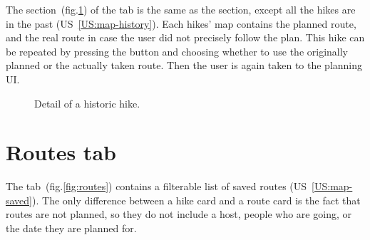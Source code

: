 The  section~(fig.\ref{fig:plan-history}) of the  tab is the same as the  section, except all the hikes are in the past (US~\ref{US:map-history}).
Each hikes' map contains the planned route, and the real route in case the user did not precisely follow the plan.
This hike can be repeated by pressing the  button and choosing whether to use the originally planned or the actually taken route.
Then the user is again taken to the planning UI.

\begin{figure}[h!]
    \centering
    \hfill
    \caption{Detail of a historic hike.}
    \label{fig:plan-history}
\end{figure}

\section{Routes tab}
The  tab~(fig.\ref{fig:routes}) contains a filterable list of saved routes (US~\ref{US:map-saved}).
The only difference between a hike card and a route card is the fact that routes are not planned, so they do not include a host, people who are going, or the date they are planned for.

